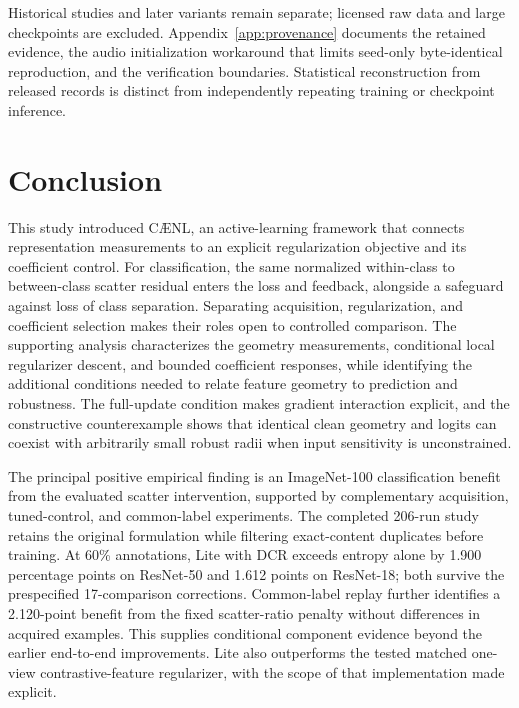 \documentclass[10pt,a4paper,twocolumn]{article}
\newcommand{\model}{C\AE{}NL}
\begin{document}
Historical studies and later variants remain separate; licensed raw data
and large checkpoints are excluded. Appendix~\ref{app:provenance} documents
the retained evidence, the audio initialization workaround that limits
seed-only byte-identical reproduction, and the verification boundaries.
Statistical reconstruction from released records is distinct from
independently repeating training or checkpoint inference.

\section{Conclusion}\label{sec:conclusion}

This study introduced \model{}, an active-learning framework that
connects representation measurements to an explicit regularization
objective and its coefficient control. For classification, the same
normalized within-class to between-class scatter residual enters the
loss and feedback, alongside a safeguard against loss of class
separation. Separating acquisition, regularization, and coefficient
selection makes their roles open to controlled comparison. The
supporting analysis characterizes the geometry measurements,
conditional local regularizer descent, and bounded coefficient
responses, while identifying the additional conditions needed to
relate feature geometry to prediction and robustness. The full-update
condition makes gradient interaction explicit, and the constructive
counterexample shows that identical clean geometry and logits can coexist
with arbitrarily small robust radii when input sensitivity is unconstrained.

The principal positive empirical finding is an ImageNet-100
classification benefit from the evaluated scatter intervention, supported by complementary acquisition,
tuned-control, and common-label experiments. The completed 206-run study
retains the original formulation while filtering exact-content duplicates
before training. At 60\% annotations, Lite with DCR exceeds entropy
alone by 1.900 percentage points on ResNet-50 and 1.612 points on
ResNet-18; both survive the prespecified 17-comparison corrections.
Common-label replay further identifies a 2.120-point benefit from the
fixed scatter-ratio penalty without differences in acquired examples.
This supplies conditional component evidence beyond the earlier
end-to-end improvements. Lite also outperforms the tested matched
one-view contrastive-feature regularizer, with the scope of that
implementation made explicit.
\end{document}
